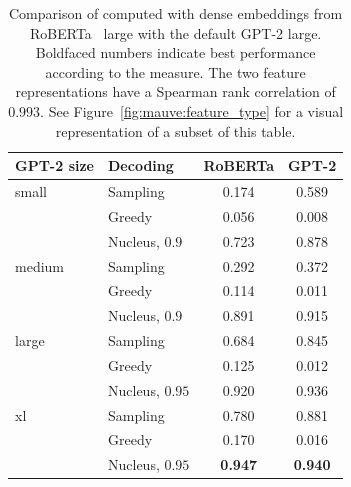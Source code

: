 \documentclass{article}
\theoremstyle{definition}
\newcommand{\name}{{\fontfamily{bch}\selectfont{\textsc{Mauve}}}\xspace}
\newcommand{\tabemph}[1]{\cellcolor{lightmauve!30}\textcolor{black!50!royalazure}{#1}}%
\begin{document}
\begin{table}[t!]
\centering
{ \small
%
\begin{tabular}{llcc}
\toprule
GPT-2 size         &     Decoding               &  
RoBERTa   &  GPT-2    \\
\midrule
small & Sampling &    0.174 &  0.589 \\
         & Greedy &   0.056 & 0.008 \\
         & Nucleus, $0.9$ &    0.723 &  0.878 \\
\midrule
medium & Sampling &    0.292 &   0.372 \\
         & Greedy &    0.114 & 0.011 \\
         & Nucleus, $0.9$ &    0.891 &  0.915 \\
\midrule
large & Sampling &    0.684 &  0.845 \\
         & Greedy &    0.125 & 0.012 \\
         & Nucleus, $0.95$ &     0.920 &  0.936 \\
\midrule
xl & Sampling &     0.780 &  0.881 \\
         & Greedy &     0.170 & 0.016 \\
         & Nucleus, $0.95$ &    \tabemph{\textbf{0.947}} &  \tabemph{\textbf{0.940}} \\
\bottomrule
\end{tabular} %
}
\caption{
Comparison of \name computed with dense embeddings from RoBERTa~\cite{liu2019roberta} large
with the default GPT-2 large.
Boldfaced numbers indicate best performance according to the measure. 
The two feature representations have a Spearman rank correlation of $0.993$.
See Figure~\ref{fig:mauve:feature_type}
for a visual representation of a subset of this table.
}
\label{tab:mauve:expt:bert-features-appendix}
\end{table}
\end{document}
